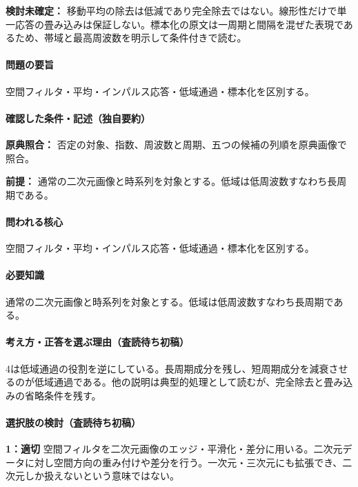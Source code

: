 \par\textbf{検討未確定：} 移動平均の除去は低減であり完全除去ではない。線形性だけで単一応答の畳み込みは保証しない。標本化の原文は一周期と間隔を混ぜた表現であるため、帯域と最高周波数を明示して条件付きで読む。

\paragraph{問題の要旨} 空間フィルタ・平均・インパルス応答・低域通過・標本化を区別する。

\paragraph{確認した条件・記述（独自要約）}\mbox{}\par

\noindent\textbf{原典照合：} 否定の対象、指数、周波数と周期、五つの候補の列順を原典画像で照合。\par

\noindent\textbf{前提：} 通常の二次元画像と時系列を対象とする。低域は低周波数すなわち長周期である。\par

\paragraph{問われる核心} 空間フィルタ・平均・インパルス応答・低域通過・標本化を区別する。

\paragraph{必要知識} 通常の二次元画像と時系列を対象とする。低域は低周波数すなわち長周期である。

\paragraph{考え方・正答を選ぶ理由（査読待ち初稿）} 4は低域通過の役割を逆にしている。長周期成分を残し、短周期成分を減衰させるのが低域通過である。他の説明は典型的処理として読むが、完全除去と畳み込みの省略条件を残す。

\paragraph{選択肢の検討（査読待ち初稿）}\mbox{}\par

\noindent\textbf{1：適切} 空間フィルタを二次元画像のエッジ・平滑化・差分に用いる。二次元データに対し空間方向の重み付けや差分を行う。一次元・三次元にも拡張でき、二次元しか扱えないという意味ではない。\par

